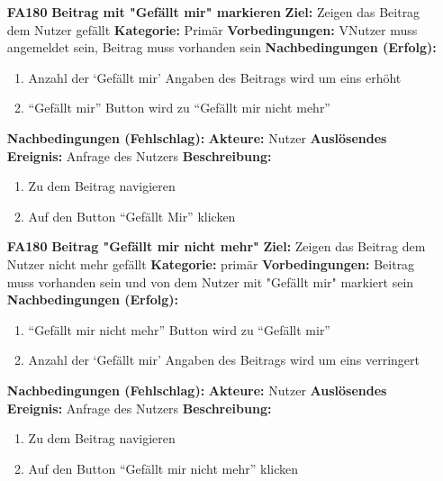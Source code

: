 \documentclass[parskip=full]{scrartcl}
\begin{document}
\begin{itemize}[nosep]
			\item[\textbf{FA180}]\textbf{Beitrag mit "Gefällt mir" markieren}
						\newline \textbf{Ziel:} Zeigen das Beitrag dem Nutzer gefällt
						\newline \textbf{Kategorie:} Primär
						\newline \textbf{Vorbedingungen:} VNutzer muss angemeldet sein, Beitrag muss vorhanden sein
						\newline \textbf{Nachbedingungen (Erfolg):} 
						\begin{enumerate}[nosep]
							\item Anzahl der ‘Gefällt mir’ Angaben des Beitrags wird um eins erhöht
							\item “Gefällt mir” Button wird zu “Gefällt mir nicht mehr”
						\end{enumerate}
						\textbf{Nachbedingungen (Fehlschlag):}
						\newline \textbf{Akteure:} Nutzer
						\newline \textbf{Auslösendes Ereignis:} Anfrage des Nutzers
						\newline \textbf{Beschreibung:}
						\begin{enumerate}[nosep]
							\item Zu dem Beitrag navigieren
							\item Auf den Button “Gefällt Mir” klicken\\
						\end{enumerate}
					
					
						\item[\textbf{FA180}]\textbf{Beitrag "Gefällt mir nicht mehr"}
						\newline \textbf{Ziel:} Zeigen das Beitrag dem Nutzer nicht mehr gefällt
						\newline \textbf{Kategorie:} primär
						\newline \textbf{Vorbedingungen:} Beitrag muss vorhanden sein und von dem Nutzer mit "Gefällt mir" markiert sein
						\newline \textbf{Nachbedingungen (Erfolg):} 
						\begin{enumerate}[nosep]
							\item “Gefällt mir nicht mehr” Button wird zu “Gefällt mir”
							\item Anzahl der ‘Gefällt mir’ Angaben des Beitrags wird um eins  verringert 
						\end{enumerate}
						\textbf{Nachbedingungen (Fehlschlag):}
						\newline \textbf{Akteure:} Nutzer
						\newline \textbf{Auslösendes Ereignis:} Anfrage des Nutzers
						\newline \textbf{Beschreibung:}
						\begin{enumerate}[nosep]
							\item Zu dem Beitrag navigieren
							\item Auf den Button “Gefällt mir nicht mehr” klicken\\
						\end{enumerate}
						

\end{itemize}
\end{document}
